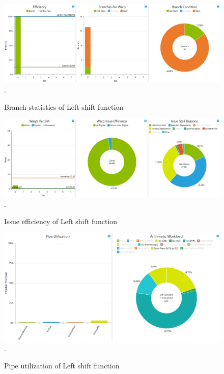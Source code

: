 \documentclass[oneside,openright,12pt,final,en]{mgr}
\begin{document}
\begin{figure}[H]
	\centering
	\includegraphics[width=\textwidth]{leftshift_branch}.
	\caption{Branch statistics of Left shift function}
	\label{fig:leftshift_branch}
\end{figure}

\begin{figure}[H]
	\centering
	\includegraphics[width=\textwidth]{leftshift_issue}.
	\caption{Issue efficiency of Left shift function}
	\label{fig:leftshift_issue}
\end{figure}

\begin{figure}[H]
	\centering
	\includegraphics[width=\textwidth]{leftshift_pipe}.
	\caption{Pipe utilization of Left shift function}
	\label{fig:leftshift_pipe}
\end{figure}
\end{document}
